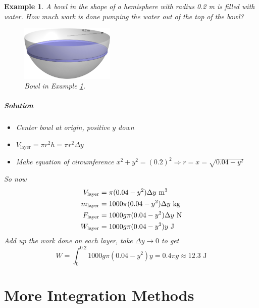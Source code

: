\documentclass[letterpaper, 11pt, openany]{book}
\theoremstyle{mytheoremstyle}
\theoremstyle{myexamplestyle}
\newtheorem{example}{Example}[section]
\newenvironment{solution}{\paragraph{\sffamily \smaller \fontseries{b}\selectfont Solution}}{\hfill\faSquare}
\begin{document}
\begin{example}
    \label{e:workhemisphere} A bowl in the shape of a hemisphere with radius 0.2 m is filled with water. How much work is done pumping the water out of the top of the bowl?
    \begin{figure}[htbp]
        \centering
            \includegraphics[width=0.4\textwidth]{Figures/workbowl.png}
        \caption{Bowl in Example \ref{e:workhemisphere}.}
        \label{f:workhemisphere}
    \end{figure}
    
    \begin{solution}
        \begin{itemize}
            \item Center bowl at origin, positive $y$ down
            \item $V_{\text{layer}} = \pi r^{2} h = \pi r^{2} \Delta y$
            \item Make equation of circumference $x^{2} + y^{2} = (0.2)^{2} \Rightarrow r = x = \sqrt{0.04 - y^{2}}$
        \end{itemize}
        So now
        \begin{align*}
            V_{\text{layer}} &= \pi (0.04 - y^{2}) \Delta y \text{ m\textsuperscript{3}}\\
            m_{\text{layer}} &= 1000 \pi (0.04 - y^{2}) \Delta y \text{ kg}\\
            F_{\text{layer}} &= 1000g \pi (0.04 - y^{2}) \Delta y \text{ N}\\
            W_{\text{layer}} &= 1000g \pi (0.04 - y^{2})y \text{ J}
        \end{align*}
        Add up the work done on each layer, take $\Delta y \to 0$ to get
        \[W = \int_{0}^{0.2} 1000g \pi (0.04 - y^{2})y = 0.4\pi g \approx  12.3\text{ J}\]
    \end{solution}
\end{example}

\newpage\thispagestyle{firstofchapter}
\chapter{More Integration Methods}
\end{document}
